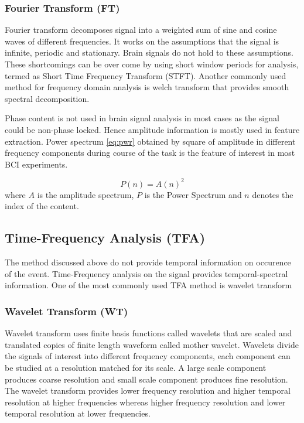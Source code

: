 \subsubsection{Fourier Transform (FT)}
Fourier transform decomposes signal into a weighted sum of sine and cosine waves of different frequencies. It works on the assumptions that the signal is infinite, periodic and stationary. Brain signals do not hold to these assumptions. These shortcomings can be over come by using short window periods for analysis, termed as Short Time Frequency Transform (STFT). Another commonly used method for frequency domain analysis is welch transform that provides smooth spectral decomposition. \par

Phase content is not used in brain signal analysis in most cases as the signal could be non-phase locked. Hence amplitude information is mostly used in feature extraction. Power spectrum \ref{eq:pwr} obtained by square of amplitude in different frequency components during course of the task is the feature of interest in most BCI experiments.

\begin{equation} \label{eq:pwr}
    P(n) = A(n)^2
\end{equation}
where $A$ is the amplitude spectrum, $P$ is the Power Spectrum and $n$ denotes the index of the content.

\subsection{Time-Frequency Analysis (TFA)}
The method discussed above do not provide temporal information on occurence of the event. Time-Frequency analysis on the signal provides temporal-spectral information. One of the most commonly used TFA method is wavelet transform

\subsubsection{Wavelet Transform (WT)}
Wavelet transform uses finite basis functions called wavelets that are scaled and translated copies of finite length waveform called mother wavelet. Wavelets divide the signals of interest into different frequency components, each component can be studied at a resolution matched for its scale. A large scale component produces coarse resolution and small scale component produces fine resolution. The wavelet transform provides lower frequency resolution and higher temporal resolution at higher frequencies whereas higher frequency resolution and lower temporal resolution at lower frequencies. \par

